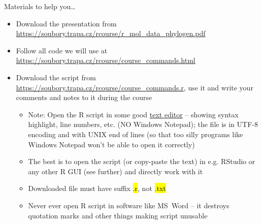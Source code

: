 \documentclass[compress, ucs, xelatex, 11pt, xcolor=svgnames,
  hyperref={
    bookmarks=true,
    unicode=true,
    colorlinks=true,
    pdftitle={Molecular data in R},
    plainpages=false,
    pdfauthor={Vojtech Zeisek},
    pdfsubject={Course about phylogeny and evolution in R},
    pdfcreator={XeLaTeX},
    pdfkeywords={R, evolution, phylogeny, molecular data},
    linkcolor=Tomato,
    anchorcolor=SaddleBrown,
    citecolor=Goldenrod,
    filecolor=DarkMagenta,
    menucolor=Sienna,
    urlcolor=DarkTurquoise,
    pdftex},
  url={hyphens, lowtilde} %
  ]{beamer}
\renewcommand{\texttt}[1]{\hl{\ttfamily #1}}
\begin{document}
\begin{frame}{Materials to help you\ldots}
  \begin{itemize}
    \item Download the presentation from \url{https://soubory.trapa.cz/rcourse/r_mol_data_phylogen.pdf}
    \item Follow all code we will use at \url{https://soubory.trapa.cz/rcourse/course_commands.html}
    \item Download the script from \url{https://soubory.trapa.cz/rcourse/course_commands.r}, use it and write your comments and notes to it during the course
    \begin{itemize}
      \item \alert{Note:} Open the R script in some \alert{good} \href{http://texteditors.org/cgi-bin/wiki.pl?PickingATextEditor}{text editor} -- showing syntax highlight, line numbers, etc. (\alert{NO} Windows Notepad); the file is in UTF-8 encoding and with UNIX end of lines (so that too silly programs like Windows Notepad won't be able to open it correctly)
      \item The best is to open the script (or copy-paste the text) in e.g. RStudio or any other R GUI (see further) and directly work with it
      \item \alert{Downloaded file must have suffix \texttt{*.r}, not \texttt{*.txt}}
      \item \alert{Never ever} open R script in software like MS~Word -- it destroys quotation marks and other things making script unusable
    \end{itemize}
  \end{itemize}
\end{frame}
\end{document}
